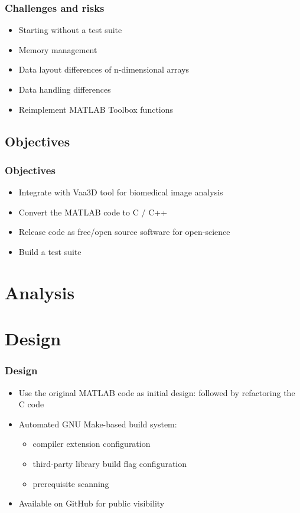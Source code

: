 \documentclass[%
        hyperref={%
                pdfauthor={Zakariyya Mughal},%
                pdfpagemode={None},pdfpagelayout={SinglePage}},%
        xcolor={x11names}%
]{beamer}
\begin{document}
\begin{frame}[label=challenges]
\frametitle{Challenges and risks}
\begin{itemize}
	\item Starting without a test suite
	\item Memory management
	\item Data layout differences of n-dimensional arrays
	\item Data handling differences
	\item Reimplement MATLAB Toolbox functions
\end{itemize}
\end{frame}

\subsection{Objectives}
\begin{frame}
\frametitle{Objectives}
\begin{itemize}
	\item Integrate with Vaa3D tool for biomedical image analysis
	\item Convert the MATLAB code to C / C++
	\item Release code as free/open source software for open-science
	\item Build a test suite
\end{itemize}
\end{frame}

\section{Analysis}

\section{Design}

\begin{frame}
\frametitle{Design}
\begin{itemize}
	\item Use the original MATLAB code as initial design: followed by refactoring the C code
	\item Automated GNU Make-based build system:
		\begin{itemize}
			\item compiler extension configuration
			\item third-party library build flag configuration
			\item prerequisite scanning
		\end{itemize}
	\item Available on GitHub for public visibility
\end{itemize}
\end{frame}
\end{document}
